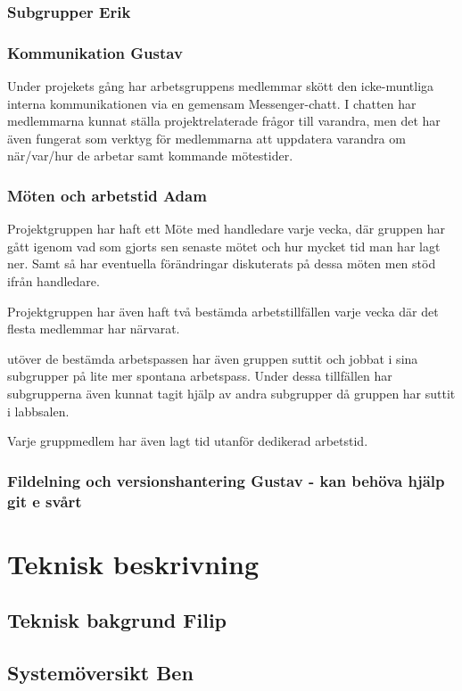 \documentclass{article}
\begin{document}
\subsubsection{Subgrupper Erik}
\subsubsection{Kommunikation Gustav}
Under projekets gång har arbetsgruppens medlemmar skött den icke-muntliga 
interna kommunikationen via en gemensam Messenger-chatt. 
I chatten har medlemmarna kunnat ställa projektrelaterade 
frågor till varandra, men det har även fungerat som verktyg
 för medlemmarna att uppdatera varandra om när/var/hur de 
 arbetar samt kommande mötestider.
\subsubsection{Möten och arbetstid Adam}
Projektgruppen har haft ett Möte med handledare varje vecka, där
gruppen har gått igenom vad som gjorts sen senaste mötet och hur
mycket tid man har lagt ner. Samt så har eventuella förändringar
diskuterats på dessa möten men stöd ifrån handledare.

Projektgruppen har även haft två bestämda arbetstillfällen varje
vecka där det flesta medlemmar har närvarat. 

utöver de bestämda arbetspassen har även gruppen suttit och 
jobbat i sina subgrupper på lite mer spontana arbetspass. Under
dessa tillfällen har subgrupperna även kunnat tagit hjälp av 
andra subgrupper då gruppen har suttit i labbsalen.

Varje gruppmedlem har även lagt tid utanför dedikerad arbetstid.  

\subsubsection{Fildelning och versionshantering Gustav - kan behöva hjälp git e svårt}


\section{Teknisk beskrivning} %
\subsection{Teknisk bakgrund Filip}
\subsection{Systemöversikt Ben}
\end{document}
